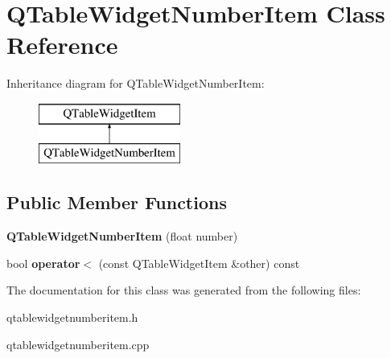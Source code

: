 \hypertarget{class_q_table_widget_number_item}{}\section{Q\+Table\+Widget\+Number\+Item Class Reference}
\label{class_q_table_widget_number_item}
Inheritance diagram for Q\+Table\+Widget\+Number\+Item\+:\begin{figure}[H]
\begin{center}
\leavevmode
\includegraphics[height=2.000000cm]{class_q_table_widget_number_item}
\end{center}
\end{figure}
\subsection*{Public Member Functions}
\begin{DoxyCompactItemize}
\item 
\hypertarget{class_q_table_widget_number_item_af630e264aa968141468580baa4d34a64}{}{\bfseries Q\+Table\+Widget\+Number\+Item} (float number)\label{class_q_table_widget_number_item_af630e264aa968141468580baa4d34a64}

\item 
\hypertarget{class_q_table_widget_number_item_af788b33af492a04549f85a1b23a71c83}{}bool {\bfseries operator$<$} (const Q\+Table\+Widget\+Item \&other) const \label{class_q_table_widget_number_item_af788b33af492a04549f85a1b23a71c83}

\end{DoxyCompactItemize}


The documentation for this class was generated from the following files\+:\begin{DoxyCompactItemize}
\item 
qtablewidgetnumberitem.\+h\item 
qtablewidgetnumberitem.\+cpp\end{DoxyCompactItemize}
